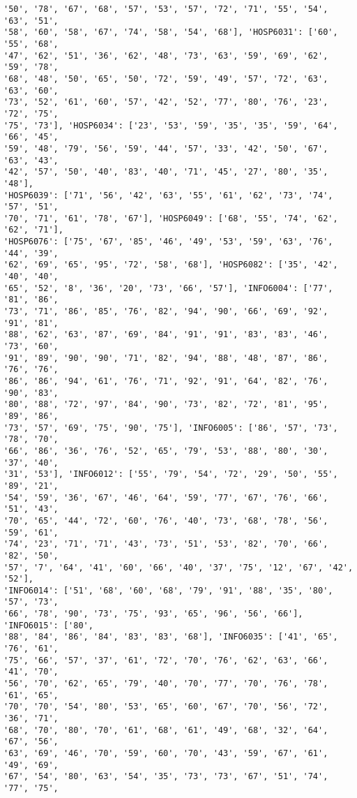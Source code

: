 \documentclass[11pt]{article}
\begin{document}
\begin{Verbatim}[commandchars=\\\{\}]
'50', '78', '67', '68', '57', '53', '57', '72', '71', '55', '54', '63', '51',
'58', '60', '58', '67', '74', '58', '54', '68'], 'HOSP6031': ['60', '55', '68',
'47', '62', '51', '36', '62', '48', '73', '63', '59', '69', '62', '59', '78',
'68', '48', '50', '65', '50', '72', '59', '49', '57', '72', '63', '63', '60',
'73', '52', '61', '60', '57', '42', '52', '77', '80', '76', '23', '72', '75',
'75', '73'], 'HOSP6034': ['23', '53', '59', '35', '35', '59', '64', '66', '45',
'59', '48', '79', '56', '59', '44', '57', '33', '42', '50', '67', '63', '43',
'42', '57', '50', '40', '83', '40', '71', '45', '27', '80', '35', '48'],
'HOSP6039': ['71', '56', '42', '63', '55', '61', '62', '73', '74', '57', '51',
'70', '71', '61', '78', '67'], 'HOSP6049': ['68', '55', '74', '62', '62', '71'],
'HOSP6076': ['75', '67', '85', '46', '49', '53', '59', '63', '76', '44', '39',
'62', '69', '65', '95', '72', '58', '68'], 'HOSP6082': ['35', '42', '40', '40',
'65', '52', '8', '36', '20', '73', '66', '57'], 'INFO6004': ['77', '81', '86',
'73', '71', '86', '85', '76', '82', '94', '90', '66', '69', '92', '91', '81',
'88', '62', '63', '87', '69', '84', '91', '91', '83', '83', '46', '73', '60',
'91', '89', '90', '90', '71', '82', '94', '88', '48', '87', '86', '76', '76',
'86', '86', '94', '61', '76', '71', '92', '91', '64', '82', '76', '90', '83',
'80', '88', '72', '97', '84', '90', '73', '82', '72', '81', '95', '89', '86',
'73', '57', '69', '75', '90', '75'], 'INFO6005': ['86', '57', '73', '78', '70',
'66', '86', '36', '76', '52', '65', '79', '53', '88', '80', '30', '37', '40',
'31', '53'], 'INFO6012': ['55', '79', '54', '72', '29', '50', '55', '89', '21',
'54', '59', '36', '67', '46', '64', '59', '77', '67', '76', '66', '51', '43',
'70', '65', '44', '72', '60', '76', '40', '73', '68', '78', '56', '59', '61',
'74', '23', '71', '71', '43', '73', '51', '53', '82', '70', '66', '82', '50',
'57', '7', '64', '41', '60', '66', '40', '37', '75', '12', '67', '42', '52'],
'INFO6014': ['51', '68', '60', '68', '79', '91', '88', '35', '80', '57', '73',
'66', '78', '90', '73', '75', '93', '65', '96', '56', '66'], 'INFO6015': ['80',
'88', '84', '86', '84', '83', '83', '68'], 'INFO6035': ['41', '65', '76', '61',
'75', '66', '57', '37', '61', '72', '70', '76', '62', '63', '66', '41', '70',
'56', '70', '62', '65', '79', '40', '70', '77', '70', '76', '78', '61', '65',
'70', '70', '54', '80', '53', '65', '60', '67', '70', '56', '72', '36', '71',
'68', '70', '80', '70', '61', '68', '61', '49', '68', '32', '64', '67', '56',
'63', '69', '46', '70', '59', '60', '70', '43', '59', '67', '61', '49', '69',
'67', '54', '80', '63', '54', '35', '73', '73', '67', '51', '74', '77', '75',

\end{Verbatim}
\end{document}
